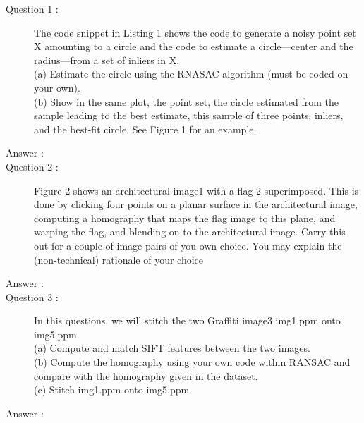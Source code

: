 \documentclass[a4paper, 12pt]{article}
\begin{document}
\begin{description}
   \item[Question 1 :] The code snippet in Listing 1 shows the code to generate a noisy point set X amounting to a circle and the code to estimate a circle—center and the radius—from a set of inliers in X.\\
(a) Estimate the circle using the RNASAC algorithm (must be coded on your own).\\
(b) Show in the same plot, the point set, the circle estimated from the sample leading to the best estimate, this sample of three points, inliers, and the best-fit circle. See Figure 1 for an example.
    
\item[Answer :] \blindtext
    

    \item[Question 2 :]  Figure 2 shows an architectural image1 with a flag 2
superimposed. This is done by clicking four points on a planar surface in the architectural image, computing a homography that maps the flag image to this plane,
and warping the flag, and blending on to the architectural image. Carry this out for a couple of image pairs of you own choice. You may explain the (non-technical) rationale of your choice
    \item[Answer :]
    

    \item[Question 3 :] In this questions, we will stitch the two Graffiti image3
img1.ppm onto img5.ppm.\\
(a) Compute and match SIFT features between the two images.\\
(b) Compute the homography using your own code within RANSAC and compare with the homography given in the dataset.\\
(c) Stitch img1.ppm onto img5.ppm
    \item[Answer :]
\end{description}
\end{document}
